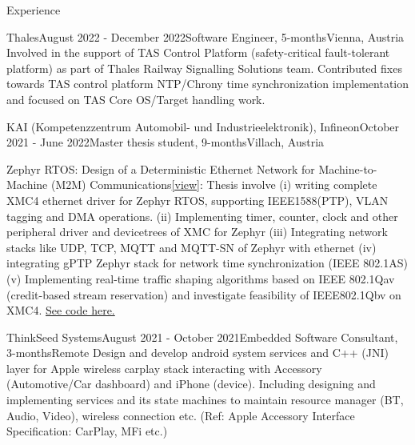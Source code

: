 \documentclass[
	a4paper, %
	11pt, %
]{resume} %
\begin{document}

\begin{rSection}{Experience}

    \begin{rSubsection}{Thales}{August 2022 - December 2022}{Software Engineer, 5-months}{Vienna, Austria}
        Involved in the support of TAS Control Platform (safety-critical fault-tolerant platform) as part 
        of Thales Railway Signalling Solutions team. Contributed fixes towards TAS control platform NTP/Chrony time 
        synchronization implementation and focused on TAS Core OS/Target handling work.
		
    \end{rSubsection}

	\begin{rSubsection}{KAI (Kompetenzzentrum Automobil- und Industrieelektronik), Infineon}{October 2021 - June 2022}{Master thesis student, 9-months}{Villach, Austria}

            {\color{orange} Zephyr RTOS: Design of a Deterministic Ethernet Network for Machine-to-Machine (M2M) Communications}\href{https://www.linkedin.com/in/sebinsphilip/overlay/1635506986689/single-media-viewer/?type=DOCUMENT&profileId=ACoAAAm-xe0BCYwezV-q9pIlhl7WYDQHRff8kIE}{[view]}: Thesis involve (i) writing complete XMC4 ethernet driver for Zephyr RTOS, supporting IEEE1588(PTP), VLAN tagging and DMA operations. (ii) Implementing timer, counter, clock and other peripheral driver and devicetrees of XMC for Zephyr (iii) Integrating network stacks like UDP, TCP, MQTT and MQTT-SN of Zephyr with ethernet (iv) integrating gPTP Zephyr stack for network time synchronization (IEEE 802.1AS) (v) Implementing real-time traffic shaping algorithms based on IEEE 802.1Qav (credit-based stream reservation) and investigate feasibility of IEEE802.1Qbv on XMC4.
            \href{https://github.com/sebinsphilip/zephyr\_xmc}{ See code here.}
		
	\end{rSubsection}


	\begin{rSubsection}{ThinkSeed Systems}{August 2021 - October 2021}{Embedded Software Consultant, 3-months}{Remote}
            Design and develop android system services and C++ (JNI) layer for Apple wireless carplay stack interacting with Accessory (Automotive/Car dashboard) and iPhone (device). Including designing and implementing services and its state machines to maintain resource manager (BT, Audio, Video), wireless connection etc. (Ref: Apple Accessory Interface Specification: CarPlay, MFi etc.)


\end{rSubsection}
\end{rSection}
\end{document}
